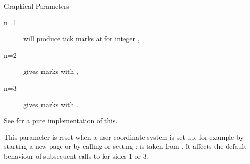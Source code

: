 \begin{Section}{Graphical Parameters}
\begin{description}
\begin{description}

\item[n=1] will produce tick marks at  for integer ,
\item[n=2] gives marks   with
,
\item[n=3] gives marks   with
.

\end{description}

See  for a pure \R{} implementation of this.

This parameter is reset when a user coordinate system is set up,
for example by starting a new page or by calling
 or setting : 
is taken from .  It affects the default behaviour
of subsequent calls to  for sides 1 or 3.


\end{description}
\end{Section}

